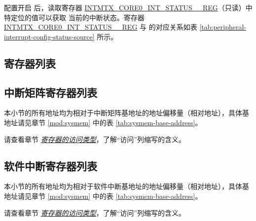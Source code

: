 \documentclass[main\_\_CN.tex]{subfiles}
\begin{document}
配置开启  后，读取寄存器 \hyperref[regdesc:INTMTXCORE0INTSTATUS0REG] {INTMTX\_CORE0\_INT\_STATUS\_\_REG}（只读）中特定位的值可以获取  当前的中断状态。寄存器 \hyperref[regdesc:INTMTXCORE0INTSTATUS0REG]{INTMTX\_CORE0\_INT\_STATUS\_\_REG} 与  的对应关系如表 \ref{tab:peripheral-interrupt-config-status-source} 所示。





\newpage
\hypertarget{intmtrx-reg-summ}{}
\begin{landscape}
\section{寄存器列表}

\subsection{中断矩阵寄存器列表}

\label{sec:intmtrx-reg-summ}

本小节的所有地址均为相对于中断矩阵基地址的地址偏移量（相对地址），具体基地址请见章节 \ref{mod:sysmem} \textit{} 中的表 \ref{tab:sysmem-base-address}。

请查看章节 \hyperref[glossary-access-types]{\textit{寄存器的访问类型}}，了解“访问”列缩写的含义。



\subsection{软件中断寄存器列表}
\label{sec:intpri-reg-summ}

本小节的所有地址均为相对于软件中断基地址的地址偏移量（相对地址），具体基地址请见章节 \ref{mod:sysmem} \textit{} 中的表 \ref{tab:sysmem-base-address}。

请查看章节 \hyperref[glossary-access-types]{\textit{寄存器的访问类型}}，了解“访问”列缩写的含义。





\end{landscape}
\end{document}
